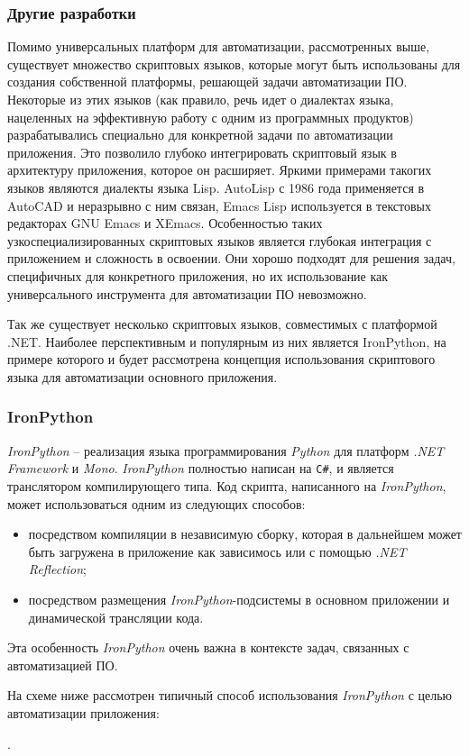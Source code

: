\subsubsection{Другие разработки}

Помимо универсальных платформ для автоматизации, рассмотренных выше, существует множество скриптовых языков, которые могут быть использованы для создания собственной платформы, решающей задачи автоматизации ПО. Некоторые из этих языков (как правило, речь идет о диалектах языка, нацеленных на эффективную работу с одним из программных продуктов) разрабатывались специально для конкретной задачи по автоматизации приложения. Это позволило глубоко интегрировать скриптовый язык в архитектуру приложения, которое он расширяет. Яркими примерами такогих языков являются диалекты языка Lisp. AutoLisp с 1986 года применяется в AutoCAD и неразрывно с ним связан, Emacs Lisp используется в текстовых редакторах GNU Emacs и XEmacs. Особенностью таких узкоспециализированных скриптовых языков является глубокая интеграция с приложением и сложность в освоении. Они хорошо подходят для решения задач, специфичных для конкретного приложения, но их использование как универсального инструмента для автоматизации ПО невозможно.

Так же существует несколько скриптовых языков, совместимых с платформой .NET. Наиболее перспективным и популярным из них является IronPython, на примере которого и будет рассмотрена концепция использования скриптового языка для автоматизации основного приложения.


\subsubsection{IronPython} %
{\it IronPython} -- реализация языка программирования {\it Python} для платформ {\it .NET Framework} и {\it Mono}. {\it IronPython} полностью написан на {\tt C\#}, и является транслятором компилирующего типа. Код скрипта, написанного на {\it IronPython}, может использоваться одним из следующих способов:
\begin{itemize}
 \item посредством компиляции в независимую сборку, которая в дальнейшем может быть загружена в приложение как зависимось или с помощью {\it .NET Reflection};
 \item посредством размещения {\it IronPython}-подсистемы в основном приложении и динамической трансляции кода.
\end{itemize}

Эта особенность {\it IronPython} очень важна в контексте задач, связанных с автоматизацией ПО.

На схеме ниже рассмотрен типичный способ использования {\it IronPython} с целью автоматизации приложения:

.